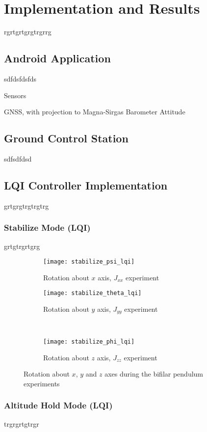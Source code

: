 \chapter{Implementation and Results} \label{ch:implementation}
rgrtgrtgrgtrgrrg

\section{Android Application}
sdfdsfdsfds

Sensors

GNSS, with projection to Magna-Sirgas
Barometer
Attitude
\section{Ground Control Station}
sdfsdfdsd

\section{LQI Controller Implementation}
grtgrgtrgtrgtrg

\subsection{Stabilize Mode (LQI)}
grtgtrgrtgrg

\begin{figure}[H]
\begin{subfigure}{.5\linewidth}
\centering
\texttt{[image: stabilize\_psi\_lqi]}
\caption{Rotation about $x$ axis, $J_{xx}$ experiment}
\label{fig:stabilize_psi_lqi_imp}
\end{subfigure}%
\begin{subfigure}{.5\linewidth}
\centering
\texttt{[image: stabilize\_theta\_lqi]}
\caption{Rotation about $y$ axis, $J_{yy}$ experiment}
\label{fig:stabilize_theta_lqi_imp}
\end{subfigure}\\[1ex]
\begin{subfigure}{\linewidth}
\centering
\texttt{[image: stabilize\_phi\_lqi]}
\caption{Rotation about $z$ axis, $J_{zz}$ experiment}
\label{fig:stabilize_psi_lqi_imp}
\end{subfigure}
\caption{Rotation about $x$, $y$ and $z$ axes during the bifilar pendulum experiments}
\label{fig:stabilize_lqi_imp}
\end{figure}

\subsection{Altitude Hold Mode (LQI)}
trgrgrtgtrgr

